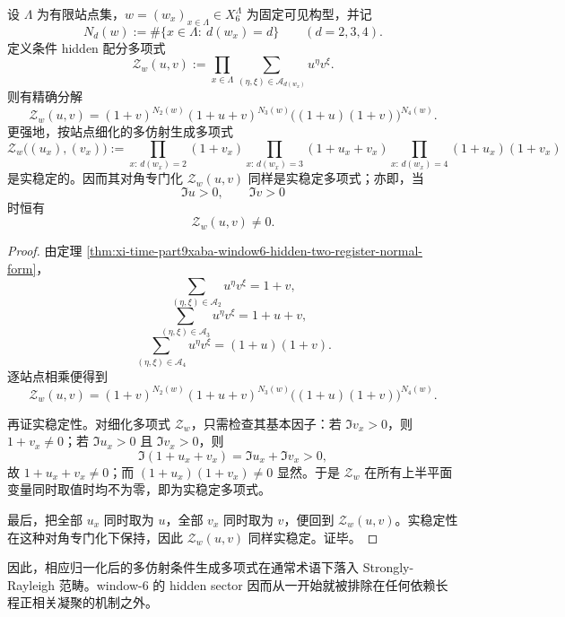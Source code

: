 \begin{theorem}\label{thm:xi-time-part9xaba-window6-hidden-generating-polynomial-real-stable}
设 \(\Lambda\) 为有限站点集，\(w=(w_x)_{x\in\Lambda}\in X_6^\Lambda\) 为固定可见构型，并记
\[
N_d(w):=\#\{x\in\Lambda:\ d(w_x)=d\}
\qquad (d=2,3,4).
\]
定义条件 hidden 配分多项式
\[
\mathcal Z_w(u,v):=
\prod_{x\in\Lambda}
\sum_{(\eta,\xi)\in\mathcal A_{d(w_x)}}u^\eta v^\xi.
\]
则有精确分解
\[
\mathcal Z_w(u,v)
=
(1+v)^{N_2(w)}(1+u+v)^{N_3(w)}\bigl((1+u)(1+v)\bigr)^{N_4(w)}.
\]
更强地，按站点细化的多仿射生成多项式
\[
\mathscr Z_w\bigl((u_x),(v_x)\bigr)
:=
\prod_{x:\,d(w_x)=2}(1+v_x)
\prod_{x:\,d(w_x)=3}(1+u_x+v_x)
\prod_{x:\,d(w_x)=4}(1+u_x)(1+v_x)
\]
是实稳定的。因而其对角专门化 \(\mathcal Z_w(u,v)\) 同样是实稳定多项式；亦即，当
\[
\Im u>0,\qquad \Im v>0
\]
时恒有
\[
\mathcal Z_w(u,v)\neq 0.
\]
\end{theorem}
\begin{proof}
由定理 \ref{thm:xi-time-part9xaba-window6-hidden-two-register-normal-form}，
\[
\sum_{(\eta,\xi)\in\mathcal A_2}u^\eta v^\xi=1+v,
\]
\[
\sum_{(\eta,\xi)\in\mathcal A_3}u^\eta v^\xi=1+u+v,
\]
\[
\sum_{(\eta,\xi)\in\mathcal A_4}u^\eta v^\xi=(1+u)(1+v).
\]
逐站点相乘便得到
\[
\mathcal Z_w(u,v)
=
(1+v)^{N_2(w)}(1+u+v)^{N_3(w)}\bigl((1+u)(1+v)\bigr)^{N_4(w)}.
\]

再证实稳定性。对细化多项式 \(\mathscr Z_w\)，只需检查其基本因子：若 \(\Im v_x>0\)，则 \(1+v_x\neq 0\)；若 \(\Im u_x>0\) 且 \(\Im v_x>0\)，则
\[
\Im(1+u_x+v_x)=\Im u_x+\Im v_x>0,
\]
故 \(1+u_x+v_x\neq 0\)；而 \((1+u_x)(1+v_x)\neq 0\) 显然。于是 \(\mathscr Z_w\) 在所有上半平面变量同时取值时均不为零，即为实稳定多项式。

最后，把全部 \(u_x\) 同时取为 \(u\)，全部 \(v_x\) 同时取为 \(v\)，便回到 \(\mathcal Z_w(u,v)\)。实稳定性在这种对角专门化下保持，因此 \(\mathcal Z_w(u,v)\) 同样实稳定。证毕。
\end{proof}

\noindent
因此，相应归一化后的多仿射条件生成多项式在通常术语下落入 Strongly-Rayleigh 范畴。window-\(6\) 的 hidden sector 因而从一开始就被排除在任何依赖长程正相关凝聚的机制之外。


